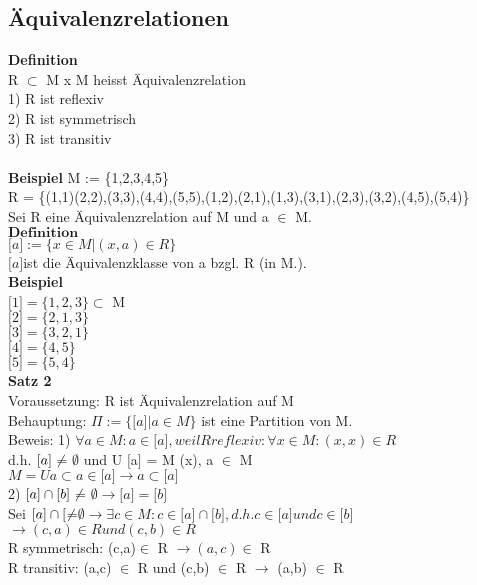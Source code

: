 \documentclass[11pt,a4paper]{article}
\begin{document}
\subsection{Äquivalenzrelationen}
\textbf{Definition}\\
R $\subset$ M x M heisst Äquivalenzrelation \\
1) R ist reflexiv\\
2) R ist symmetrisch\\
3) R ist transitiv\\\\
\textbf{Beispiel}
M := \{1,2,3,4,5\}\\
R = \{(1,1)(2,2),(3,3),(4,4),(5,5),(1,2),(2,1),(1,3),(3,1),(2,3),(3,2),(4,5),(5,4)\}\\
Sei R eine Äquivalenzrelation auf M und a $\in$ M.\\
$\textbf{Definition}$\\
$\lbrack a \rbrack := \{x \in M | (x,a) \in R \}$\\
$\lbrack a \rbrack $ist die Äquivalenzklasse von a bzgl. R (in M.).\\

\textbf{Beispiel}\\
$\lbrack 1 \rbrack = \{1,2,3\} \subset $ M\\
$\lbrack 2 \rbrack = \{2,1,3\} $\\
$\lbrack 3 \rbrack = \{3,2,1\} $\\
$\lbrack 4 \rbrack = \{4,5\} $\\
$\lbrack 5 \rbrack = \{5,4\} $\\


\textbf{Satz 2} \\
Voraussetzung: R ist Äquivalenzrelation auf M\\
Behauptung: $\Pi := \{\lbrack a \rbrack | a \in M\}$ ist eine Partition von M.\\
Beweis: 1) $\forall a \in M : a \in \lbrack a \rbrack , weil R reflexiv : \forall x \in M : (x,x) \in R$\\
d.h. $\lbrack a \rbrack \not$= $\emptyset$ und U $\lbrack$a$\rbrack$ = M (x), a $\in$ M\\
$M = U{a} \subset a \in \lbrack a \rbrack \rightarrow {a} \subset \lbrack a \rbrack $\\
2) $\lbrack a \rbrack \cap \lbrack b \rbrack \not$= $\emptyset \rightarrow \lbrack a \rbrack = \lbrack b \rbrack$ \\
Sei $\lbrack a \rbrack \cap \lbrack \not$=$\emptyset \rightarrow \exists c \in M : c \in \lbrack a \rbrack \cap \lbrack b \rbrack, d.h. c \in \lbrack a \rbrack und c \in \lbrack b \rbrack $\\
$\rightarrow (c,a) \in R und (c,b) \in R$ \\
R symmetrisch: (c,a)$\in$ R $\rightarrow (a,c) \in$ R \\
R transitiv: (a,c) $\in$ R und (c,b) $\in$ R $\rightarrow$ (a,b) $\in$ R\\
\end{document}
